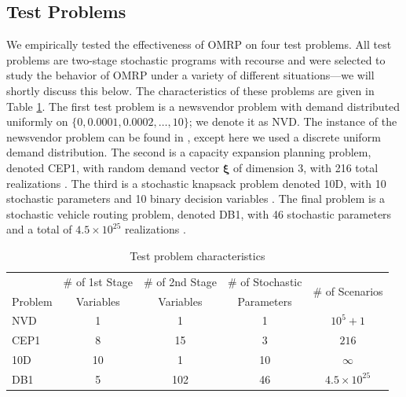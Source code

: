 \documentclass[12pt]{article}
\newcommand{\xit}{\boldsymbol{\xi}}
\begin{document}
\subsection{Test Problems}
\label{ssec:test}


We empirically tested the effectiveness of OMRP on four test problems.
All test problems are two-stage stochastic programs with recourse and were selected to study the behavior of OMRP under a variety of different situations---we will shortly discuss this below.
The characteristics of these problems are given in Table \ref{tb:test_problems}. 
The first test problem is a newsvendor problem with demand distributed uniformly on $\{0, 0.0001, 0.0002, \dots, 10\}$; we denote it as NVD.
The instance of the newsvendor problem can be found in \citep{Bayraksan2006}, except here we used a discrete uniform demand distribution.
The second is a capacity expansion planning problem, denoted CEP1, with random demand vector $\xit$ of dimension 3, with 216 total realizations \citep{higle1996}.
The third is a stochastic knapsack problem denoted 10D, with 10 stochastic parameters and 10 binary decision variables \citep{kleywegt2002sample}.
The final problem is a stochastic vehicle routing problem, denoted DB1, with 46 stochastic parameters and a total of $4.5 \times 10^{25}$ realizations \citep{donohue1995upper}.


\begin{table}[thb]
\centering
\footnotesize
\begin{tabular}{lcccc}
\hline
& \# of 1st Stage & \# of 2nd Stage & \# of Stochastic & \multirow{2}{*}{\# of Scenarios} \\
Problem & Variables & Variables & Parameters & \\
\cmidrule(r){1-1} \cmidrule(l){2-5}
NVD 	& 1     	& 1     	& 1   	& $10^5 + 1$ \\
CEP1 	& 8     	& 15   	& 3   	& $216$ \\
10D 	& 10     & 1     	& 10   	& $\infty$ \\
DB1 	& 5   	& 102   	& 46   	& $4.5\times 10^{25}$ \\
\hline
\end{tabular}
\caption{Test problem characteristics}
\label{tb:test_problems}
\end{table}
\end{document}
